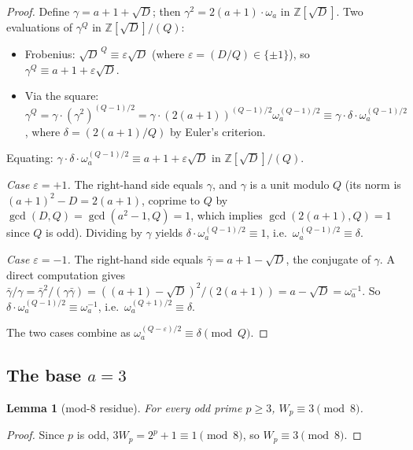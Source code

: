 \documentclass[11pt,a4paper]{amsart}
\theoremstyle{plain}
\newtheorem{lemma}[theorem]{Lemma}
\theoremstyle{definition}
\newcommand{\Z}{\mathbb{Z}}
\begin{document}
\begin{proof}
Define $\gamma = a + 1 + \sqrt{D}$; then
$\gamma^2 = 2(a + 1) \cdot \omega_a$ in $\Z[\sqrt{D}]$. Two
evaluations of $\gamma^Q$ in $\Z[\sqrt{D}]/(Q)$:
\begin{itemize}
\item Frobenius: $\sqrt{D}^{\,Q} \equiv \varepsilon \sqrt{D}$ (where
  $\varepsilon = (D/Q) \in \{\pm 1\}$), so
  $\gamma^Q \equiv a + 1 + \varepsilon \sqrt{D}$.
\item Via the square: $\gamma^Q = \gamma \cdot (\gamma^2)^{(Q-1)/2} =
  \gamma \cdot (2(a+1))^{(Q-1)/2} \omega_a^{(Q-1)/2} \equiv \gamma
  \cdot \delta \cdot \omega_a^{(Q-1)/2}$, where
  $\delta = (2(a+1)/Q)$ by Euler's criterion.
\end{itemize}
Equating:
$\gamma \cdot \delta \cdot \omega_a^{(Q-1)/2} \equiv a + 1 +
\varepsilon \sqrt{D}$ in $\Z[\sqrt{D}]/(Q)$.

\emph{Case $\varepsilon = +1$.} The right-hand side equals $\gamma$,
and $\gamma$ is a unit modulo $Q$ (its norm is $(a+1)^2 - D = 2(a+1)$,
coprime to $Q$ by $\gcd(D,Q) = \gcd(a^2-1,Q) = 1$, which implies
$\gcd(2(a+1), Q) = 1$ since $Q$ is odd). Dividing by $\gamma$ yields
$\delta \cdot \omega_a^{(Q - 1)/2} \equiv 1$, i.e.\
$\omega_a^{(Q-1)/2} \equiv \delta$.

\emph{Case $\varepsilon = -1$.} The right-hand side equals
$\bar\gamma = a + 1 - \sqrt{D}$, the conjugate of $\gamma$. A direct
computation gives $\bar\gamma / \gamma = \bar\gamma^2 / (\gamma
\bar\gamma) = ((a+1) - \sqrt{D})^2 / (2(a+1)) = a - \sqrt{D} =
\omega_a^{-1}$. So
$\delta \cdot \omega_a^{(Q - 1)/2} \equiv \omega_a^{-1}$, i.e.\
$\omega_a^{(Q+1)/2} \equiv \delta$.

The two cases combine as
$\omega_a^{(Q - \varepsilon)/2} \equiv \delta \pmod{Q}$.
\end{proof}

\subsection{The base $a=3$}

\begin{lemma}[mod-$8$ residue]
\label{lem:mod8}
For every odd prime $p \geq 3$, $W_p \equiv 3 \pmod{8}$.
\end{lemma}

\begin{proof}
Since $p$ is odd, $3 W_p = 2^p + 1 \equiv 1 \pmod 8$, so $W_p \equiv 3
\pmod 8$.
\end{proof}
\end{document}
